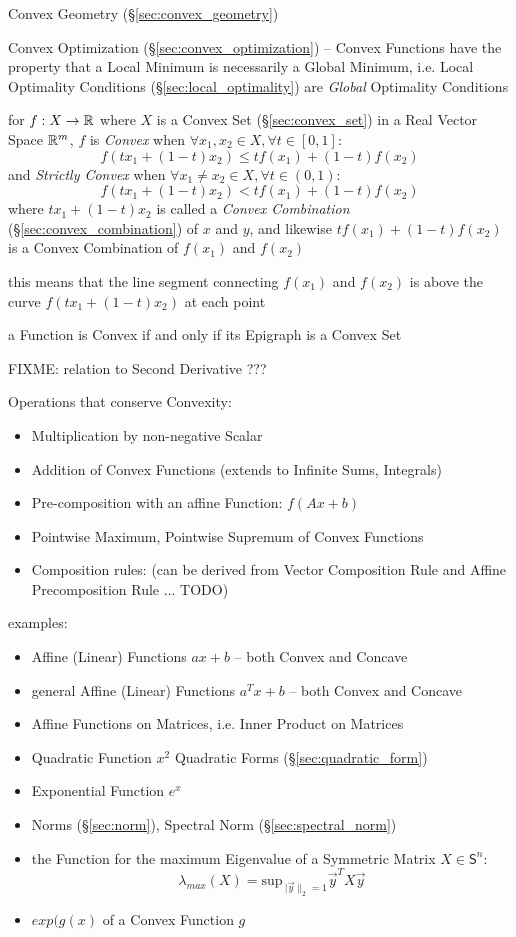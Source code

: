 \fist Convex Geometry (\S\ref{sec:convex_geometry})

\fist Convex Optimization (\S\ref{sec:convex_optimization}) -- Convex Functions
have the property that a Local Minimum is necessarily a Global Minimum, i.e.
Local Optimality Conditions (\S\ref{sec:local_optimality}) are \emph{Global}
Optimality Conditions

for $f : X \rightarrow \mathbb{R}$ where $X$ is a Convex Set
(\S\ref{sec:convex_set}) in a Real Vector Space $\mathbb{R}^m$, $f$ is
\emph{Convex} when $\forall x_1, x_2 \in X, \forall t \in [0,1]$:
\[
  f(tx_1 + (1-t)x_2) \leq tf(x_1) + (1-t)f(x_2)
\]
and \emph{Strictly Convex} when $\forall x_1 \neq x_2 \in X, \forall t \in
(0,1)$:
\[
  f(tx_1 + (1-t)x_2) < tf(x_1) + (1-t)f(x_2)
\]
where $tx_1 + (1-t)x_2$ is called a \emph{Convex Combination}
(\S\ref{sec:convex_combination}) of $x$ and $y$, and likewise $tf(x_1) +
(1-t)f(x_2)$ is a Convex Combination of $f(x_1)$ and $f(x_2)$

this means that the line segment connecting $f(x_1)$ and $f(x_2)$ is above the
curve $f(tx_1 + (1-t)x_2)$ at each point

a Function is Convex if and only if its Epigraph is a Convex Set

FIXME: relation to Second Derivative ???

Operations that conserve Convexity:
\begin{itemize}
  \item Multiplication by non-negative Scalar
  \item Addition of Convex Functions (extends to Infinite Sums, Integrals)
  \item Pre-composition with an affine Function: $f(Ax + b)$
  \item Pointwise Maximum, Pointwise Supremum of Convex Functions
  \item Composition rules: (can be derived from Vector Composition Rule and
    Affine Precomposition Rule ... TODO)
\end{itemize}

examples:
\begin{itemize}
  \item Affine (Linear) Functions $ax + b$ -- both Convex and Concave
  \item general Affine (Linear) Functions $a^T x + b$ -- both Convex and Concave
  \item Affine Functions on Matrices, i.e. Inner Product on Matrices
  \item Quadratic Function $x^2$ \fist Quadratic Forms
    (\S\ref{sec:quadratic_form})
  \item Exponential Function $e^x$
  \item Norms (\S\ref{sec:norm}), Spectral Norm (\S\ref{sec:spectral_norm})
  \item the Function for the maximum Eigenvalue of a Symmetric Matrix $X \in
    \mathsf{S}^n$:
    \[
      \lambda_{max}(X) = \mathrm{sup}_{\ |\vec{y}\|_2=1} \vec{y}^T X \vec{y}
    \]
  \item $exp (g(x)$ of a Convex Function $g$
\end{itemize}



